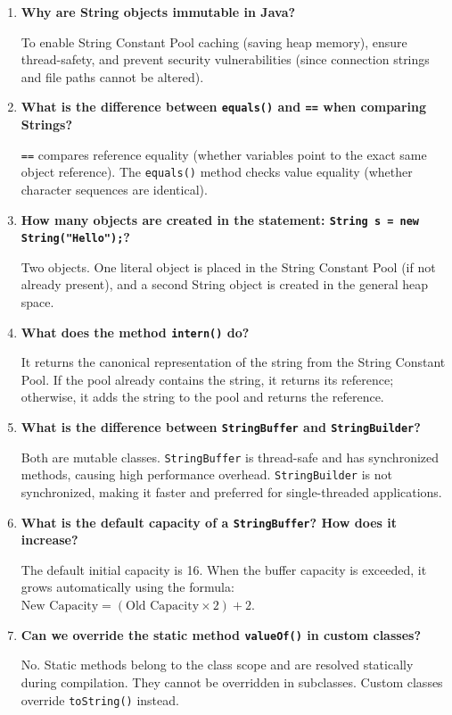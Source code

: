 \documentclass[12pt,a4paper]{article}
\newcommand{\Q}[1]{\textbf{#1}\par\noindent\ignorespaces}
\begin{document}
\begin{tcolorbox}[exambox, title={\textbf{Frequently Asked / Viva Questions}}]
\begin{enumerate}[leftmargin=*, label=\textbf{Q\arabic*.}, itemsep=5pt]
  \item \Q{Why are String objects immutable in Java?}
        To enable String Constant Pool caching (saving heap memory), ensure thread-safety, and prevent security vulnerabilities (since connection strings and file paths cannot be altered).
        
  \item \Q{What is the difference between \texttt{equals()} and \texttt{==} when comparing Strings?}
        \texttt{==} compares reference equality (whether variables point to the exact same object reference). The \texttt{equals()} method checks value equality (whether character sequences are identical).
        
  \item \Q{How many objects are created in the statement: \texttt{String s = new String("Hello");}?}
        Two objects. One literal object is placed in the String Constant Pool (if not already present), and a second String object is created in the general heap space.
        
  \item \Q{What does the method \texttt{intern()} do?}
        It returns the canonical representation of the string from the String Constant Pool. If the pool already contains the string, it returns its reference; otherwise, it adds the string to the pool and returns the reference.
        
  \item \Q{What is the difference between \texttt{StringBuffer} and \texttt{StringBuilder}?}
        Both are mutable classes. \texttt{StringBuffer} is thread-safe and has synchronized methods, causing high performance overhead. \texttt{StringBuilder} is not synchronized, making it faster and preferred for single-threaded applications.
        
  \item \Q{What is the default capacity of a \texttt{StringBuffer}? How does it increase?}
        The default initial capacity is 16. When the buffer capacity is exceeded, it grows automatically using the formula: $\text{New Capacity} = (\text{Old Capacity} \times 2) + 2$.
        
  \item \Q{Can we override the static method \texttt{valueOf()} in custom classes?}
        No. Static methods belong to the class scope and are resolved statically during compilation. They cannot be overridden in subclasses. Custom classes override \texttt{toString()} instead.
        

\end{enumerate}
\end{tcolorbox}
\end{document}
